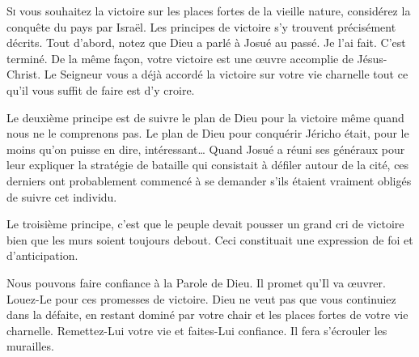 


\lettrine{S}{i} vous souhaitez la victoire sur les places fortes
 de la vieille nature, considérez la conquête du pays par Israël.
 Les principes de victoire s'y trouvent précisément décrits.
 Tout d'abord, notez que Dieu a parlé à Josué au passé.
 \Og Je l'ai fait. C'est terminé. \Fg{}
 De la même fa\c{c}on, votre victoire est une \oe{}uvre accomplie de Jésus-Christ.
 Le Seigneur vous a déjà accordé la victoire sur votre vie charnelle
 \ocadr tout ce qu'il vous suffit de faire est d'y croire.

Le deuxième principe est de suivre le plan de Dieu pour la victoire
 même quand nous ne le comprenons pas.
 Le plan de Dieu pour conquérir Jéricho était,
 pour le moins qu'on puisse en dire, intéressant\dots{}
 Quand Josué a réuni ses généraux pour leur expliquer
 la stratégie de bataille qui consistait à défiler autour de la cité,
 ces derniers ont probablement commencé à se demander
 s'ils étaient vraiment obligés de suivre cet individu.


Le troisième principe, c'est que le peuple devait pousser
 un grand cri de victoire \ocadr bien que les murs soient toujours debout.
 Ceci constituait une expression de foi et d'anticipation.

Nous pouvons faire confiance à la Parole de Dieu. Il promet qu'Il va \oe{}uvrer.
 Louez-Le pour ces promesses de victoire.
 Dieu ne veut pas que vous continuiez dans la défaite,
 en restant dominé par votre chair et les places fortes de votre vie charnelle.
 Remettez-Lui votre vie et faites-Lui confiance.
 Il fera s'écrouler les murailles. 

\dvrule



